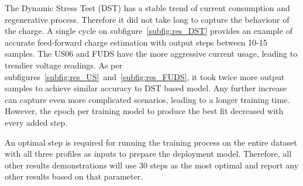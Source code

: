     The Dynamic Stress Test (DST) has a stable trend of current consumption and regenerative process.
    Therefore it did not take long to capture the behaviour of the charge.
    A single cycle on \mbox{subfigure~\ref{subfig:res_DST}} provides an example of accurate feed-forward charge estimation with output steps between 10-15 samples.
    The US06 and FUDS have the more aggressive current usage, leading to trendier voltage readings.
    As per \mbox{subfigures~\ref{subfig:res_US} and~\ref{subfig:res_FUDS}}, it took twice more output samples to achieve similar accuracy to DST based model.
    Any further increase can capture even more complicated scenarios, leading to a longer training time.
    However, the epoch per training model to produce the best fit decreased with every added step.
    
    An optimal step is required for running the training process on the entire dataset with all three profiles as inputs to prepare the deployment model.
    Therefore, all other results demonstrations will use 30 steps as the most optimal and report any other results based on that parameter.

